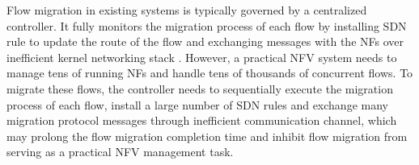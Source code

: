 
Flow migration in existing systems \cite{rajagopalan2013split, gember2015opennf} is typically governed by a centralized controller. It fully monitors the migration process of each flow by installing SDN rule to update the route of the flow and exchanging messages with the NFs over inefficient kernel networking stack \cite{netmap}. However, a practical NFV system needs to manage tens of running NFs and handle tens of thousands of concurrent flows. To migrate these flows, the controller needs to sequentially execute the migration process of each flow, install a large number of SDN rules and exchange many migration protocol messages through inefficient communication channel, which may prolong the flow migration completion time and inhibit flow migration from serving as a practical NFV management task.


